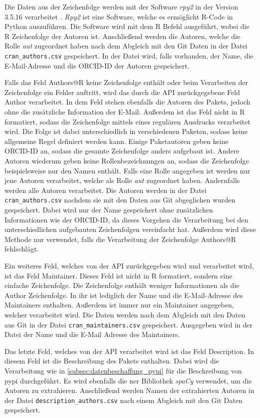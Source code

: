 Die Daten aus der Zeichenfolge werden mit der Software \emph{rpy2} in der Version 3.5.16 verarbeitet \autocite{noauthor_rpy2rpy2_2024}.
\emph{Rpy2} ist eine Software, welche es ermöglicht R-Code in Python auszuführen.
Die Software wird mit dem R Befehl  ausgeführt, wobei  die R Zeichenfolge der Autoren ist.
Anschließend werden die Autoren, welche die Rolle \emph{aut} zugeordnet haben nach dem Abgleich mit den Git Daten in der Datei \texttt{cran\_authors.csv} gespeichert.
In der Datei wird, falls vorhanden, der Name, die E-Mail-Adresse und die ORCID-ID der Autoren gespeichert.

Falls das Feld \glqq Authors@R\grqq{} keine Zeichenfolge enthält oder beim Verarbeiten der Zeichenfolge ein Fehler auftritt, wird das durch die API zurückgegebene Feld \glqq Author\grqq{} verarbeitet.
In dem Feld stehen ebenfalls die Autoren des Pakets, jedoch ohne die zusätzliche Information der E-Mail.
Außerdem ist das Feld nicht in R formatiert, sodass die Zeichenfolge mittels eines regulären Ausdrucks verarbeitet wird.
Die Folge ist dabei unterschiedlich in verschiedenen Paketen, sodass keine allgemeine Regel definiert werden kann.
Einige Paketautoren geben keine ORCID-ID an, sodass die gesamte Zeichenfolge anders aufgebaut ist.
Andere Autoren wiederum geben keine Rollenbezeichnungen an, sodass die Zeichenfolge beispielsweise nur den Namen enthält.
Falls eine Rolle angegeben ist werden nur jene Autoren verarbeitet, welche als Rolle \emph{aut} zugeordnet haben.
Andernfalls werden alle Autoren verarbeitet.
Die Autoren werden in der Datei \texttt{cran\_authors.csv} nachdem sie mit den Daten aus Git abgeglichen wurden gespeichert.
Dabei wird nur der Name gespeichert ohne zusätzlichen Informationen wie der ORCID-ID, da dieses Vorgehen die Verarbeitung bei den unterschiedlichen aufgebauten Zeichenfolgen vereinfacht hat.
Außerdem wird diese Methode nur verwendet, falls die Verarbeitung der Zeichenfolge \glqq Authors@R\grqq{} fehlschlägt.

Ein weiteres Feld, welches von der API zurückgegeben wird und verarbeitet wird, ist das Feld \glqq Maintainer\grqq{}.
Dieses Feld ist nicht in R formatiert, sondern eine einfache Zeichenfolge.
Die Zeichenfolge enthält weniger Informationen als die \glqq Author\grqq{} Zeichenfolge.
In ihr ist lediglich der Name und die E-Mail-Adresse des Maintainers enthalten.
Außerdem ist immer nur ein Maintainer angegeben, welcher verarbeitet wird.
Die Daten werden nach dem Abgleich mit den Daten aus Git in der Datei \texttt{cran\_maintainers.csv} gespeichert.
Ausgegeben wird in der Datei der Name und die E-Mail Adresse des Maintainers.

Das letzte Feld, welches von der API verarbeitet wird ist das Feld \glqq Description\grqq{}.
In diesem Feld ist die Beschreibung des Pakets enthalten.
Dabei wird die Verarbeitung wie in \autoref{subsec:datenbeschaffung_pypi} für die Beschreibung von \gls{pypi} durchgeführt.
Es wird ebenfalls die \gls{ner} Bibliothek \emph{spaCy} verwendet, um die Autoren zu extrahieren.
Anschließend werden Namen der extrahierten Autoren in der Datei \texttt{description\_authors.csv} nach einem Abgleich mit den Git Daten gespeichert.
